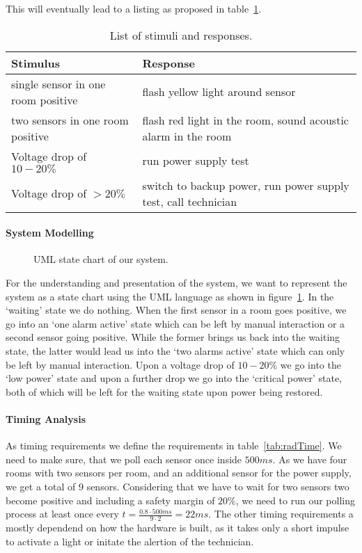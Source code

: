 \documentclass[10pt,a4paper,titlepage,draft]{article} %
\begin{document}
This will eventually lead to a listing as proposed in table~\ref{tab:radWarner}.
\begin{table}[htbp]
\begin{tabular}{|p{4cm}|p{7.2cm}|}
\hline %
\rowcolor{gray} Stimulus & Response \\
\hline %
single sensor in one room positive & flash yellow light around sensor \\
\hline %
two sensors in one room positive & flash red light in the room, sound acoustic alarm in the room\\
\hline %
Voltage drop of $10-20\%$ & run power supply test\\
\hline %
Voltage drop of $>20\%$ & switch to backup power, run power supply test, call technician\\
\hline %
\end{tabular}
\caption{List of stimuli and responses.}
\label{tab:radWarner}
\end{table}

\paragraph{System Modelling}
\begin{figure}[htbp]
\centering
\scalebox{.7}{}
\caption{UML state chart of our system.}
\label{fig:radState}
\end{figure}
For the understanding and presentation of the system, we want to represent the system as a state chart using the UML language as shown in figure~\ref{fig:radState}.
In the `waiting' state we do nothing.
When the first sensor in a room goes positive, we go into an `one alarm active' state which can be left by manual interaction or a second sensor going positive.
While the former brings us back into the waiting state, the latter would lead us into the `two alarms active' state which can only be left by manual interaction.
Upon a voltage drop of $10-20\%$ we go into the `low power' state and upon a further drop we go into the `critical power' state, both of which will be left for the waiting state upon power being restored.

\paragraph{Timing Analysis}
As timing requirements we define the requirements in table~\ref{tab:radTime}.
We need to make sure, that we poll each sensor once inside $500ms$.
As we have four rooms with two sensors per room, and an additional sensor for the power supply, we get a total of 9 sensors.
Considering that we have to wait for two sensors two become positive and including a safety margin of $20\%$, we need to run our polling process at least once every $\displaystyle t=\frac{0.8\cdot500ms}{9\cdot2}=22ms$. The other timing requirements a mostly dependend on how the hardware is built, as it takes only a short impulse to activate a light or initate the alertion of the technician.
\end{document}
